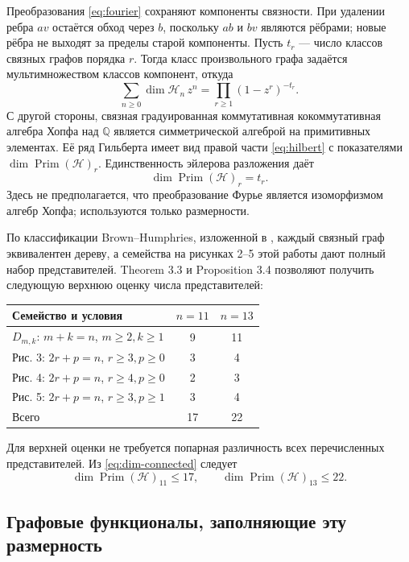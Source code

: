 \documentclass[11pt,a4paper]{article}
\numberwithin{equation}{section}
\theoremstyle{definition}
\theoremstyle{remark}
\newcommand{\Q}{\mathbb Q}
\newcommand{\Prim}{\operatorname{Prim}}
\begin{document}
Преобразования \eqref{eq:fourier} сохраняют компоненты связности.
При удалении ребра $a v$ остаётся обход через $b$, поскольку
$ab$ и $bv$ являются рёбрами; новые рёбра не выходят за пределы
старой компоненты. Пусть $t_r$ --- число классов связных графов
порядка $r$. Тогда класс произвольного графа задаётся мультимножеством
классов компонент, откуда
\begin{equation}\label{eq:hilbert}
 \sum_{n\ge0}\dim\mathcal H_n\,z^n
 =\prod_{r\ge1}(1-z^r)^{-t_r}.
\end{equation}
С другой стороны, связная градуированная коммутативная
кокоммутативная алгебра Хопфа над $\Q$ является симметрической
алгеброй на примитивных элементах. Её ряд Гильберта имеет вид
правой части \eqref{eq:hilbert} с показателями
$\dim\Prim(\mathcal H)_r$. Единственность эйлерова разложения даёт
\begin{equation}\label{eq:dim-connected}
 \dim\Prim(\mathcal H)_r=t_r.
\end{equation}
Здесь не предполагается, что преобразование Фурье является
изоморфизмом алгебр Хопфа; используются только размерности.

По классификации Brown--Humphries, изложенной в \cite{seven},
каждый связный граф эквивалентен дереву, а семейства на рисунках
2--5 этой работы дают полный набор представителей.
Theorem 3.3 и Proposition 3.4 позволяют получить следующую верхнюю
оценку числа представителей:
\begin{center}
\begin{tabular}{lcc}
\toprule
Семейство и условия&$n=11$&$n=13$\\\midrule
$D_{m,k}$: $m+k=n$, $m\ge2,k\ge1$&9&11\\
Рис. 3: $2r+p=n$, $r\ge3,p\ge0$&3&4\\
Рис. 4: $2r+p=n$, $r\ge4,p\ge0$&2&3\\
Рис. 5: $2r+p=n$, $r\ge3,p\ge1$&3&4\\\midrule
Всего&17&22\\\bottomrule
\end{tabular}
\end{center}
Для верхней оценки не требуется попарная различность всех
перечисленных представителей. Из \eqref{eq:dim-connected} следует
\begin{equation}\label{eq:dim-upper}
 \dim\Prim(\mathcal H)_{11}\le17,\qquad
 \dim\Prim(\mathcal H)_{13}\le22.
\end{equation}

\subsection{Графовые функционалы, заполняющие эту размерность}
\end{document}
